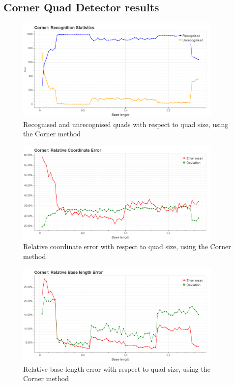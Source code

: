 \clearpage

\subsection{Corner Quad Detector results}

\begin{figure}[ht]
	\centering
	\includegraphics[width=0.9\textwidth]{figures/plots/corner_rec_unrec_count.png}
	\caption{Recognised and unrecognised quads with respect to quad size, using the Corner method}
	\label{fig:cornerRecCnt}
\end{figure}

\begin{figure}[ht]
	\centering
	\includegraphics[width=0.9\textwidth]{figures/plots/corner_relative_coordinate_error.png}
	\caption{Relative coordinate error with respect to quad size, using the Corner method}
	\label{fig:cornerRelCoordErr}
\end{figure}

\begin{figure}[ht]
	\centering
	\includegraphics[width=0.9\textwidth]{figures/plots/corner_relative_base_length_error.png}
	\caption{Relative base length error with respect to quad size, using the Corner method}
	\label{fig:cornerRelBaseErr}
\end{figure}

